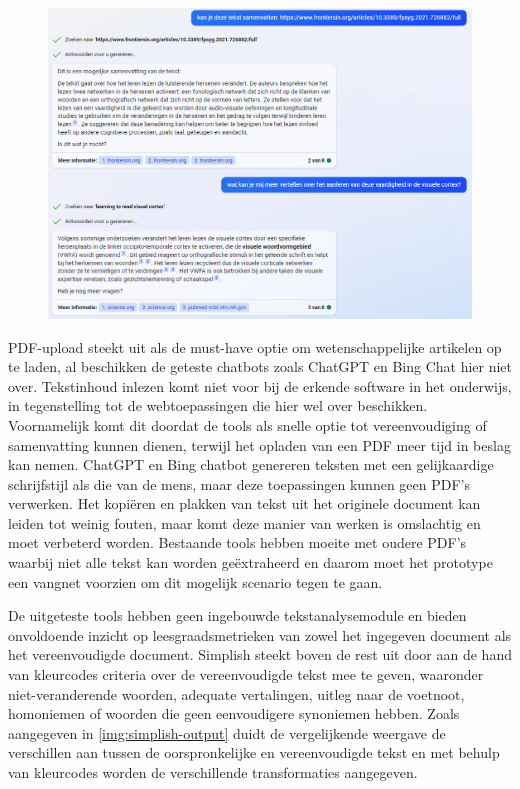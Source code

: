 \begin{figure}[H]
	\includegraphics{img/bing-ai-chatbot-example.png}
	\caption{}
	\label{img:tryout-bing-ai}
\end{figure}

\medspace

PDF-upload steekt uit als de must-have optie om wetenschappelijke artikelen op te laden, al beschikken de geteste chatbots zoals ChatGPT en Bing Chat hier niet over. Tekstinhoud inlezen komt niet voor bij de erkende software in het onderwijs, in tegenstelling tot de webtoepassingen die hier wel over beschikken. Voornamelijk komt dit doordat de tools als snelle optie tot vereenvoudiging of samenvatting kunnen dienen, terwijl het opladen van een PDF meer tijd in beslag kan nemen. ChatGPT en Bing chatbot genereren teksten met een gelijkaardige schrijfstijl als die van de mens, maar deze toepassingen kunnen geen PDF's verwerken. Het kopiëren en plakken van tekst uit het originele document kan leiden tot weinig fouten, maar komt deze manier van werken is omslachtig en moet verbeterd worden. Bestaande tools hebben moeite met oudere PDF's waarbij niet alle tekst kan worden geëxtraheerd en daarom moet het prototype een vangnet voorzien om dit mogelijk scenario tegen te gaan.

\medspace

De uitgeteste tools hebben geen ingebouwde tekstanalysemodule en bieden onvoldoende inzicht op leesgraadsmetrieken van zowel het ingegeven document als het vereenvoudigde document. Simplish steekt boven de rest uit door aan de hand van kleurcodes criteria over de vereenvoudigde tekst mee te geven, waaronder niet-veranderende woorden, adequate vertalingen, uitleg naar de voetnoot, homoniemen of woorden die geen eenvoudigere synoniemen hebben. Zoals aangegeven in \ref{img:simplish-output} duidt de vergelijkende weergave de verschillen aan tussen de oorspronkelijke en vereenvoudigde tekst en met behulp van kleurcodes worden de verschillende transformaties aangegeven.

